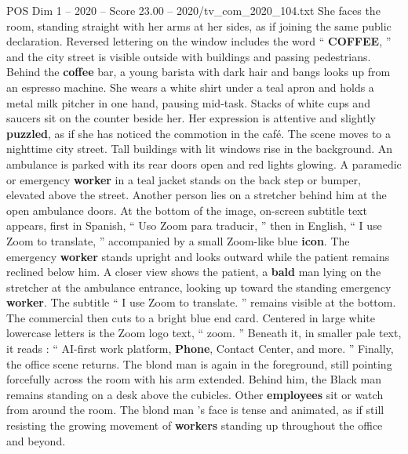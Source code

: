 \begin{textsample}{POS Dim 1 – 2020 – Score 23.00 – 2020/tv\_com\_2020\_104.txt}
She faces the room, standing straight with her arms at her sides, as if joining the same public declaration.
Reversed lettering on the window includes the word “ \textbf{COFFEE}, ” and the city street is visible outside with buildings and passing pedestrians.
Behind the \textbf{coffee} bar, a young barista with dark hair and bangs looks up from an espresso machine.
She wears a white shirt under a teal apron and holds a metal milk pitcher in one hand, pausing mid-task.
Stacks of white cups and saucers sit on the counter beside her.
Her expression is attentive and slightly \textbf{puzzled}, as if she has noticed the commotion in the café.
The scene moves to a nighttime city street.
Tall buildings with lit windows rise in the background.
An ambulance is parked with its rear doors open and red lights glowing.
A paramedic or emergency \textbf{worker} in a teal jacket stands on the back step or bumper, elevated above the street.
Another person lies on a stretcher behind him at the open ambulance doors.
At the bottom of the image, on-screen subtitle text appears, first in Spanish, “ Uso Zoom para traducir, ” then in English, “ I use Zoom to translate, ” accompanied by a small Zoom-like blue \textbf{icon}.
The emergency \textbf{worker} stands upright and looks outward while the patient remains reclined below him.
A closer view shows the patient, a \textbf{bald} man lying on the stretcher at the ambulance entrance, looking up toward the standing emergency \textbf{worker}.
The subtitle “ I use Zoom to translate. ” remains visible at the bottom.
The commercial then cuts to a bright blue end card.
Centered in large white lowercase letters is the Zoom logo text, “ zoom. ” Beneath it, in smaller pale text, it reads : “ AI-first work platform, \textbf{Phone}, Contact Center, and more. ” Finally, the office scene returns.
The blond man is again in the foreground, still pointing forcefully across the room with his arm extended.
Behind him, the Black man remains standing on a desk above the cubicles.
Other \textbf{employees} sit or watch from around the room.
The blond man ’s face is tense and animated, as if still resisting the growing movement of \textbf{workers} standing up throughout the office and beyond.

\end{textsample}
